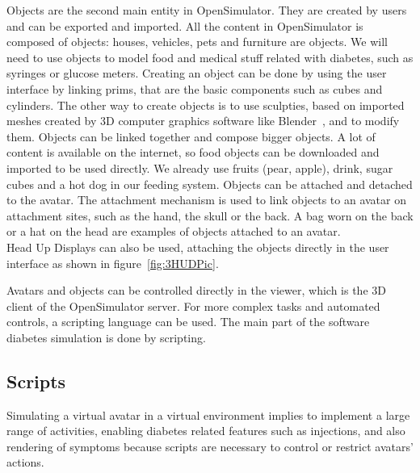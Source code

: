 Objects are the second main entity in OpenSimulator. They are created by users and can be exported and imported. All the content in OpenSimulator is composed of objects: houses, vehicles, pets and furniture are objects. We will need to use objects to model food and medical stuff related with diabetes, such as syringes or glucose meters. Creating an object can be done by using the user interface by linking prims, that are the basic components such as cubes and cylinders. The other way to create objects is to use sculpties, based on imported meshes created by 3D computer graphics software like Blender~\cite{BlenderWebsite}, and to modify them. Objects can be linked together and compose bigger objects.
A lot of content is available on the internet, so food objects can be downloaded and imported to be used directly. We already use fruits (pear, apple), drink, sugar cubes and a hot dog in our feeding system. Objects can be attached and detached to the avatar. The attachment mechanism is used to link objects to an avatar on attachment sites, such as the hand, the skull or the back. A bag worn on the back or a hat on the head are examples of objects attached to an avatar.\\
Head Up Displays can also be used, attaching the objects directly in the user interface as shown in figure~\ref{fig:3HUDPic}.

Avatars and objects can be controlled directly in the viewer, which is the 3D client of the OpenSimulator server. For more complex tasks and automated controls, a scripting language can be used. The main part of the software diabetes simulation is done by scripting. 

\subsection{Scripts}
Simulating a virtual avatar in a virtual environment implies to implement a large range of activities, enabling diabetes related features such as injections, and also rendering of symptoms because scripts are necessary to control or restrict avatars' actions.

